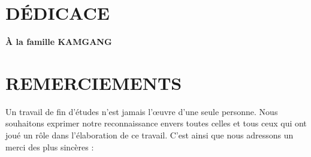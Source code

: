 
\chapter*{DÉDICACE}

\vspace*{\fill}
\begin{center}
{\fontsize{20}{26}\selectfont\bfseries\color{keyceblue} À la famille KAMGANG}
\end{center}
\vspace*{\fill}

\cleardoublepage
{}
\chapter*{REMERCIEMENTS}

Un travail de fin d'études n'est jamais l'œuvre d'une seule personne. Nous
souhaitons exprimer notre reconnaissance envers toutes celles et tous ceux qui
ont joué un rôle dans l'élaboration de ce travail. C'est ainsi que nous
adressons un merci des plus sincères :

